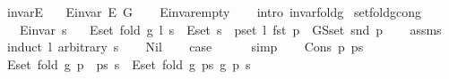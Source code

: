 \begin{isabellebody}
\ invar{\isacharunderscore}{\kern0pt}E{\isacharcolon}{\kern0pt}\isanewline
\ \ \ {\isachardoublequoteopen}E{\isachardot}{\kern0pt}invar\ {\isacharparenleft}{\kern0pt}E\ G{\isacharparenright}{\kern0pt}{\isachardoublequoteclose}\isanewline
%
\isadelimproof
\ \ %
\endisadelimproof
%
\isatagproof
{}\isamarkupfalse%
\ E{\isachardot}{\kern0pt}invar{\isacharunderscore}{\kern0pt}empty\isanewline
\ \ \isamarkupfalse%
\ {\isacharparenleft}{\kern0pt}intro\ invar{\isacharunderscore}{\kern0pt}fold{\isacharunderscore}{\kern0pt}g{\isacharparenright}{\kern0pt}%
\endisatagproof
{\isafoldproof}%
%
\isadelimproof
\isanewline
%
\endisadelimproof
\isanewline
{}\isamarkupfalse%
\ set{\isacharunderscore}{\kern0pt}fold{\isacharunderscore}{\kern0pt}g{\isacharunderscore}{\kern0pt}cong{\isacharcolon}{\kern0pt}\isanewline
\ \ \ {\isachardoublequoteopen}E{\isachardot}{\kern0pt}invar\ s{\isachardoublequoteclose}\isanewline
\ \ \ {\isachardoublequoteopen}E{\isachardot}{\kern0pt}set\ {\isacharparenleft}{\kern0pt}fold\ g\ l\ s{\isacharparenright}{\kern0pt}\ {\isacharequal}{\kern0pt}\ E{\isachardot}{\kern0pt}set\ s\ {\isasymunion}\ {\isacharparenleft}{\kern0pt}{\isasymUnion}p{\isasymin}set\ l{\isachardot}{\kern0pt}\ {\isacharbraceleft}{\kern0pt}fst\ p{\isacharbraceright}{\kern0pt}\ {\isasymtimes}\ G{\isachardot}{\kern0pt}S{\isachardot}{\kern0pt}set\ {\isacharparenleft}{\kern0pt}snd\ p{\isacharparenright}{\kern0pt}{\isacharparenright}{\kern0pt}{\isachardoublequoteclose}\isanewline
%
\isadelimproof
\ \ %
\endisadelimproof
%
\isatagproof
{}\isamarkupfalse%
\ assms\isanewline
{}\isamarkupfalse%
\ {\isacharparenleft}{\kern0pt}induct\ l\ arbitrary{\isacharcolon}{\kern0pt}\ s{\isacharparenright}{\kern0pt}\isanewline
\ \ \isamarkupfalse%
\ Nil\isanewline
\ \ \isamarkupfalse%
\ {\isacharquery}{\kern0pt}case\isanewline
\ \ \ \ \isamarkupfalse%
\ simp\isanewline
{}\isamarkupfalse%
\isanewline
\ \ \isamarkupfalse%
\ {\isacharparenleft}{\kern0pt}Cons\ p\ ps{\isacharparenright}{\kern0pt}\isanewline
\ \ \isamarkupfalse%
\ {\isachardoublequoteopen}E{\isachardot}{\kern0pt}set\ {\isacharparenleft}{\kern0pt}fold\ g\ {\isacharparenleft}{\kern0pt}p\ {\isacharhash}{\kern0pt}\ ps{\isacharparenright}{\kern0pt}\ s{\isacharparenright}{\kern0pt}\ {\isacharequal}{\kern0pt}\ E{\isachardot}{\kern0pt}set\ {\isacharparenleft}{\kern0pt}fold\ g\ ps\ {\isacharparenleft}{\kern0pt}g\ p\ s{\isacharparenright}{\kern0pt}{\isacharparenright}{\kern0pt}{\isachardoublequoteclose}\isanewline

\end{isabellebody}
